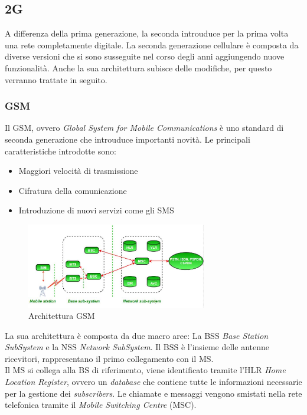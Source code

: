 \clearpage

\subsection{2G}
A differenza della prima generazione, la seconda introuduce per la prima volta una rete completamente digitale.
La seconda generazione cellulare è composta da diverse versioni che si sono susseguite nel corso degli anni aggiungendo nuove 
funzionalità.
Anche la sua architettura subisce delle modifiche, per questo verranno trattate in seguito.
\subsubsection{GSM}
Il GSM, ovvero \textit{Global System for Mobile Communications} è uno standard di seconda generazione che introuduce importanti novità.
Le principali caratteristiche introdotte sono:
\begin{itemize}
    \item Maggiori velocità di trasmissione
    \item Cifratura della comunicazione
    \item Introduzione di nuovi servizi come gli SMS
\end{itemize}
\begin{figure}[ht]
    \centering
    \includegraphics[width=0.7\textwidth]{images/2g-gsm.jpg}
    \caption{Architettura GSM}
\end{figure}
La sua architettura è composta da due macro aree: La BSS \textit{Base Station SubSystem} e la NSS \textit{Network SubSystem}.
Il BSS è l'insieme delle antenne ricevitori, rappresentano il primo collegamento con il MS.\\
Il MS si collega alla BS di riferimento, viene identificato tramite l'HLR \textit{Home Location Register}, ovvero un \textit{database} 
che contiene tutte le informazioni necessarie per la gestione dei \textit{subscribers}. Le chiamate e messaggi vengono smistati nella rete 
telefonica tramite il \textit{Mobile Switching Centre} (MSC).
